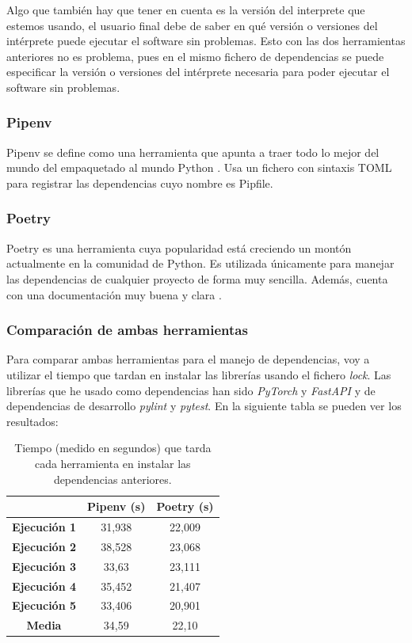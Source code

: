 Algo que también hay que tener en cuenta es la versión del interprete que estemos usando, el usuario final debe de saber en qué versión o versiones del intérprete puede ejecutar el software sin problemas. Esto con las dos herramientas anteriores no es problema, pues en el mismo fichero de dependencias se puede especificar la versión o versiones del intérprete necesaria para poder ejecutar el software sin problemas.

\subsubsection*{Pipenv}

Pipenv se define como una herramienta que apunta a traer todo lo mejor del mundo del empaquetado al mundo Python \cite{pipenv}. Usa un fichero con sintaxis TOML para registrar las dependencias cuyo nombre es Pipfile.

\subsubsection*{Poetry}

Poetry es una herramienta cuya popularidad está creciendo un montón actualmente en la comunidad de Python. Es utilizada únicamente para manejar las dependencias de cualquier proyecto de forma muy sencilla. Además, cuenta con una documentación muy buena y clara \cite{poetry}.

\subsubsection*{Comparación de ambas herramientas}

Para comparar ambas herramientas para el manejo de dependencias, voy a utilizar el tiempo que tardan en instalar las librerías usando el fichero \textit{lock}. Las librerías que he usado como dependencias han sido \textit{PyTorch} y \textit{FastAPI} y de dependencias de desarrollo \textit{pylint} y \textit{pytest}. En la siguiente tabla se pueden ver los resultados:

\begin{table}[h]
\begin{tabular}{|c|c|c|}
\hline
                     & \textbf{Pipenv (s)} & \textbf{Poetry (s)} \\ \hline
\textbf{Ejecución 1} & 31,938          & 22,009          \\ \hline
\textbf{Ejecución 2} & 38,528          & 23,068          \\ \hline
\textbf{Ejecución 3} & 33,63           & 23,111          \\ \hline
\textbf{Ejecución 4} & 35,452          & 21,407          \\ \hline
\textbf{Ejecución 5} & 33,406          & 20,901          \\ \hline
\textbf{Media}       & 34,59           & 22,10           \\ \hline
\end{tabular}
\centering
\caption{Tiempo (medido en segundos) que tarda cada herramienta en instalar las dependencias anteriores.}
\label{tab:poetryvspipenv}
\end{table}

